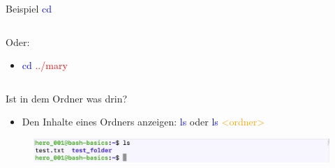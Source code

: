 \documentclass[t, xcolor=dvipsnames]{beamer}
\begin{document}
\begin{frame}{Beispiel \textcolor{blue}{cd}}
\begin{columns}
\begin{column}{0.5\textwidth}
           Oder:
           \begin{itemize}
               \item \textcolor{blue}{cd} \textcolor{red}{../mary}
           \end{itemize}
            
        \end{column}
    \end{columns}
    
    
	
	
\end{frame}

\begin{frame}{Ist in dem Ordner was drin?}
    \begin{itemize}
        \item Den Inhalte eines Ordners anzeigen: \textcolor{blue}{ls} oder \textcolor{blue}{ls} \textcolor{orange}{<ordner>}
    \end{itemize}
    
    \begin{figure}
        \centering
        \includegraphics[width=1\textwidth]{graphics/ls}
    \end{figure}
    
\end{frame}
\end{document}
